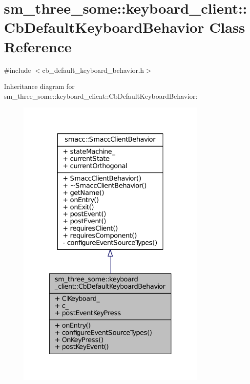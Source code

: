 \hypertarget{classsm__three__some_1_1keyboard__client_1_1CbDefaultKeyboardBehavior}{}\section{sm\+\_\+three\+\_\+some\+:\+:keyboard\+\_\+client\+:\+:Cb\+Default\+Keyboard\+Behavior Class Reference}
\label{classsm__three__some_1_1keyboard__client_1_1CbDefaultKeyboardBehavior}


{\ttfamily \#include $<$cb\+\_\+default\+\_\+keyboard\+\_\+behavior.\+h$>$}



Inheritance diagram for sm\+\_\+three\+\_\+some\+:\+:keyboard\+\_\+client\+:\+:Cb\+Default\+Keyboard\+Behavior\+:
\nopagebreak
\begin{figure}[H]
\begin{center}
\leavevmode
\includegraphics[width=267pt]{classsm__three__some_1_1keyboard__client_1_1CbDefaultKeyboardBehavior__inherit__graph}
\end{center}
\end{figure}


